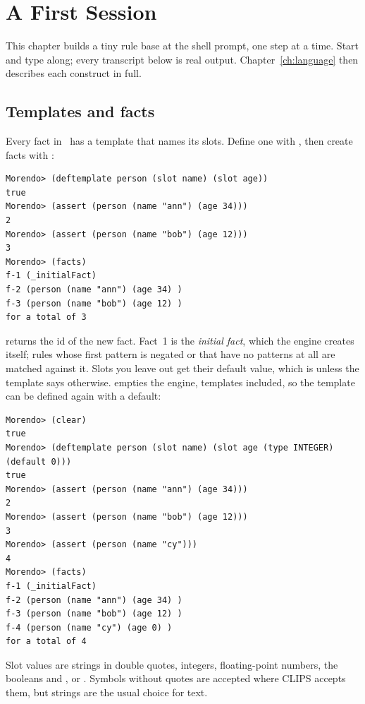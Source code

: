 \chapter{A First Session}
\label{ch:tutorial}

This chapter builds a tiny rule base at the shell prompt, one step at a
time. Start  and type along; every transcript below is
real output. Chapter~\ref{ch:language} then describes each construct in
full.

\section{Templates and facts}

Every fact in \Morendo\ has a template that names its slots. Define one
with , then create facts with :

\begin{lstlisting}[style=shell]
Morendo> (deftemplate person (slot name) (slot age))
true
Morendo> (assert (person (name "ann") (age 34)))
2
Morendo> (assert (person (name "bob") (age 12)))
3
Morendo> (facts)
f-1 (_initialFact)
f-2 (person (name "ann") (age 34) )
f-3 (person (name "bob") (age 12) )
for a total of 3
\end{lstlisting}

 returns the id of the new fact. Fact~1 is the
\emph{initial fact}, which the engine creates itself; rules whose first
pattern is negated or that have no patterns at all are matched against it.
Slots you leave out get their default value, which is  unless the
template says otherwise.  empties the engine, templates
included, so the template can be defined again with a default:

\begin{lstlisting}[style=shell]
Morendo> (clear)
true
Morendo> (deftemplate person (slot name) (slot age (type INTEGER) (default 0)))
true
Morendo> (assert (person (name "ann") (age 34)))
2
Morendo> (assert (person (name "bob") (age 12)))
3
Morendo> (assert (person (name "cy")))
4
Morendo> (facts)
f-1 (_initialFact)
f-2 (person (name "ann") (age 34) )
f-3 (person (name "bob") (age 12) )
f-4 (person (name "cy") (age 0) )
for a total of 4
\end{lstlisting}

Slot values are strings in double quotes, integers, floating-point numbers,
the booleans  and , or . Symbols without quotes
are accepted where CLIPS accepts them, but strings are the usual choice for
text.


